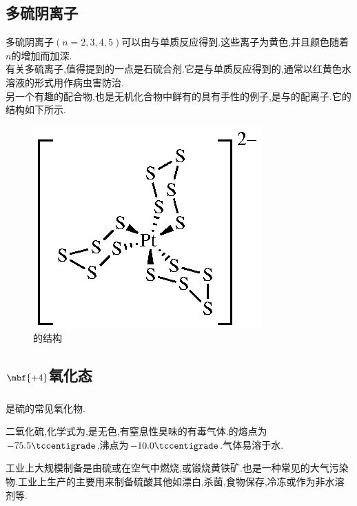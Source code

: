 \documentclass{ctexart}
\begin{document}
\subsection{多硫阴离子}
多硫阴离子$\left(n=2,3,4,5\right)$可以由与单质反应得到.这些离子为黄色,并且颜色随着$n$的增加而加深.\\
\indent 有关多硫离子,值得提到的一点是石硫合剂.它是与单质反应得到的,通常以红黄色水溶液的形式用作病虫害防治.\\
\indent 另一个有趣的配合物,也是无机化合物中鲜有的具有手性的例子,是与的配离子.它的结构如下所示.
\begin{figure}[H]
    \centering\includegraphics{picture/PtS15.eps}
    \caption{的结构}
\end{figure}
\subsection{$\mbf{+4}$氧化态}
\subsubsection{}
是硫的常见氧化物.
\begin{substance}[\ce{SO2}]
    二氧化硫,化学式为,是无色,有窒息性臭味的有毒气体.的熔点为$-75.5\tccentigrade$,沸点为$-10.0\tccentigrade$.气体易溶于水.
\end{substance}
工业上大规模制备是由硫或在空气中燃烧,或锻烧黄铁矿.也是一种常见的大气污染物.工业上生产的主要用来制备硫酸其他如漂白,杀菌,食物保存,冷冻或作为非水溶剂等.
\end{document}
